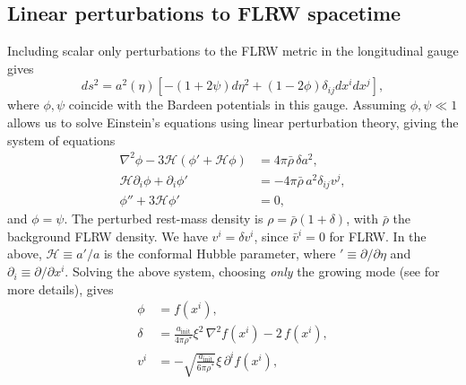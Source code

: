 
\subsection{Linear perturbations to FLRW spacetime}

Including scalar only perturbations to the FLRW metric in the longitudinal gauge gives
\begin{equation}\label{eq:perturbed_metric}
	ds^2 = a^2(\eta) \left[ - \left(1 + 2\psi\right) d\eta^2 + \left(1 - 2\phi \right) \delta_{ij}dx^i dx^j \right],
\end{equation}
where $\phi,\psi$ coincide with the Bardeen potentials \cite{bardeen1980} in this gauge. Assuming $\phi,\psi\ll1$ allows us to solve Einstein's equations using linear perturbation theory, giving the system of equations \cite{macpherson2017,macpherson2019}
 \begin{subequations} \label{eqs:perturbed_einstein}
	\begin{align}
		\nabla^{2}\phi - 3 \mathcal{H}\left(\phi' + \mathcal{H} \phi\right) &= 4\pi  \bar{\rho}\,\delta a^{2}, \label{eq:einstein_1} \\ 
		\mathcal{H} \partial_{i}\phi + \partial_{i}\phi' &= -4\pi \bar{\rho} \,a^{2} \delta_{ij}v^{j}, \label{eq:einstein_2} \\ 
		\phi'' + 3\mathcal{H}\phi' &=0, \label{eq:einstein_3}
	\end{align}	
\end{subequations}
and $\phi=\psi$. The perturbed rest-mass density is $\rho = \bar{\rho} \left(1 + \delta \right)$, with $\bar{\rho}$ the background FLRW density. We have $v^i = \delta v^i$, since $\bar{v}^i = 0$ for FLRW. In the above, $\mathcal{H}\equiv a'/a$ is the conformal Hubble parameter, where $'\equiv \partial/\partial\eta$ and $\partial_i \equiv \partial/\partial x^i$. Solving the above system, choosing \emph{only} the growing mode (see \cite{macpherson2019} for more details), gives
\begin{subequations} \label{eqs:linear_solnsg0}
    \begin{align}
    	\phi &= f(x^{i}), \label{eq:linear_phi}\\
     	\delta &= \frac{a_{\mathrm{init}}}{4\pi\rho^{*}} \xi^{2}\, \nabla^{2}f(x^{i}) - 2 \,f(x^{i}), \\
     	v^{i} &= -\sqrt{\frac{a_{\mathrm{init}}}{6\pi\rho^{*}}} \xi\, \partial^{i}f(x^{i}),
    \end{align}
\end{subequations}
